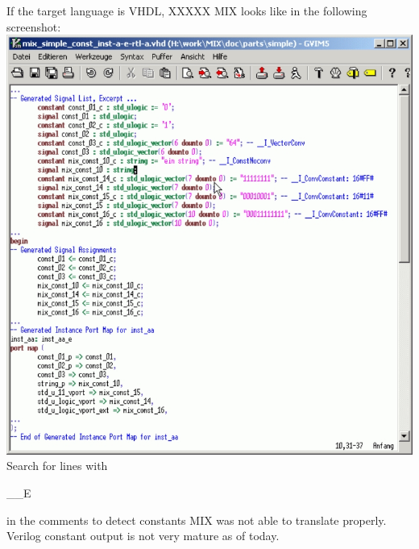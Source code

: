 \documentclass[a4paper,12pt]{article}
\begin{document}
\newline
If the target language is VHDL, XXXXX\newline
MIX looks like in the following screenshot:\newline
\includegraphics[scale=0.4]{images/mix_simple_inst.jpg}\\
Search for lines with \begin{tt}\_\_E\end{tt} in the comments to detect constants MIX was not able to translate properly. Verilog constant output is not very mature as of today.\newline
\end{document}
